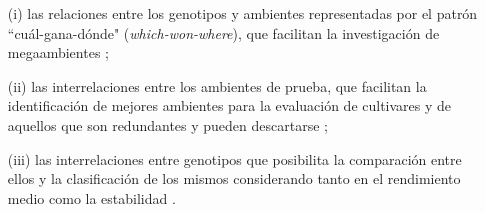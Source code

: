 \begin{itemize}
\item[(i)] las relaciones entre los genotipos y ambientes representadas por el patrón ``cuál-gana-dónde" (\emph{which-won-where}), que facilitan la investigación de megaambientes \citep{GauchZobel1997};

\item[(ii)] las interrelaciones entre los ambientes de prueba, que facilitan la identificación de mejores ambientes para la evaluación de cultivares \citep{Cooperetal1997} y de aquellos que son redundantes y pueden descartarse \citep{YanRajcan2002};

\item[(iii)] las interrelaciones entre genotipos que posibilita la comparación entre ellos y la clasificación de los mismos considerando tanto en el rendimiento medio como la estabilidad \citep{Yanetal2001}.
\end{itemize}

